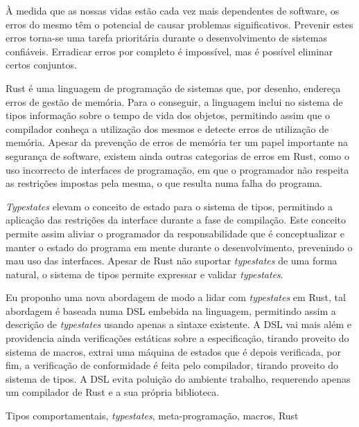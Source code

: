 

À medida que as nossas vidas estão cada vez mais dependentes de software,
os erros do mesmo têm o potencial de causar problemas significativos.
Prevenir estes erros torna-se uma tarefa prioritária durante o desenvolvimento de sistemas confiáveis.
Erradicar erros por completo é impossível, mas é possível eliminar certos conjuntos.

Rust é uma linguagem de programação de sistemas que, por desenho, endereça erros de gestão de memória.
Para o conseguir, a linguagem inclui no sistema de tipos informação sobre o tempo de vida dos objetos,
permitindo assim que o compilador conheça a utilização dos mesmos e detecte erros de utilização de memória.
Apesar da prevenção de erros de memória ter um papel importante na segurança de software,
existem ainda outras categorias de erros em Rust,
como o uso incorrecto de interfaces de programação, em que o programador não respeita as restrições impostas pela mesma, o que resulta numa falha do programa.

\emph{Typestates} elevam o conceito de estado para o sistema de tipos,
permitindo a aplicação das restrições da interface durante a fase de compilação.
Este conceito permite assim aliviar o programador da responsabilidade que é conceptualizar e manter o estado do programa em mente durante o desenvolvimento, prevenindo o mau uso das interfaces.
Apesar de Rust não suportar \emph{typestates} de uma forma natural,
o sistema de tipos permite expressar e validar \emph{typestates}.

Eu proponho uma nova abordagem de modo a lidar com \emph{typestates} em Rust,
tal abordagem é baseada numa \gls{DSL} embebida na linguagem,
permitindo assim a descrição de \emph{typestates} usando apenas a sintaxe existente.
A \gls{DSL} vai mais além e providencia ainda verificações estáticas sobre a especificação,
tirando proveito do sistema de macros, extrai uma máquina de estados que é depois verificada,
por fim, a verificação de conformidade é feita pelo compilador, tirando proveito do sistema de tipos.
A \gls{DSL} evita poluição do ambiente trabalho, requerendo apenas um compilador de Rust e a sua própria biblioteca.


\begin{keywords}
Tipos comportamentais, \emph{typestates}, meta-programação, macros, Rust
\end{keywords}
